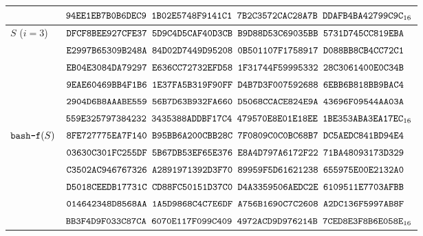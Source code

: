\begin{table}[H]
\begin{tabular}{|l|l|}
&
$\texttt{94EE1EB7B0B6DEC9~1B02E5748F9141C1~7B2C3572CAC28A7B~DDAFB4BA42799C9C}_{16}$\\
\hline
$S$ ($i=3$) &
$\texttt{DFCF8BEE927CFE37~5D9C4D5CAF40D3CB~B9D88D53C69035BB~5731D745CC819EBA}$\\
&
$\texttt{E2997B65309B248A~84D02D7449D95208~0B501107F1758917~D088BB8CB4CC72C1}$\\
&
$\texttt{EB04E3084DA79297~E636CC72732EFD58~1F31744F59995332~28C3061400E0C34B}$\\
&
$\texttt{9EAE60469BB4F1B6~1E37FA5B319F90FF~D4B7D3F007592688~6EBB6B818BB9BAC4}$\\
&
$\texttt{2904D6B8AAABE559~56B7D63B932FA660~D5068CCACE824E9A~43696F09544AA03A}$\\
&
$\texttt{559E325797384232~3435388ADDBF17C4~479570E8E01E18EE~1BE353ABA3EA17EC}_{16}$\\
\hline
\hline
$\texttt{bash-f}(S)$ &
$\texttt{8FE727775EA7F140~B95BB6A200CBB28C~7F0809C0C0BC68B7~DC5AEDC841BD94E4}$\\
&
$\texttt{03630C301FC255DF~5B67DB53EF65E376~E8A4D797A6172F22~71BA48093173D329}$\\
&
$\texttt{C3502AC946767326~A2891971392D3F70~89959F5D61621238~655975E00E2132A0}$\\
&
$\texttt{D5018CEEDB17731C~CD88FC50151D37C0~D4A3359506AEDC2E~6109511E7703AFBB}$\\
&
$\texttt{014642348D8568AA~1A5D9868C4C7E6DF~A756B1690C7C2608~A2DC136F5997AB8F}$\\
&
$\texttt{BB3F4D9F033C87CA~6070E117F099C409~4972ACD9D976214B~7CED8E3F8B6E058E}_{16}$\\
\hline
\end{tabular}
\end{table}

